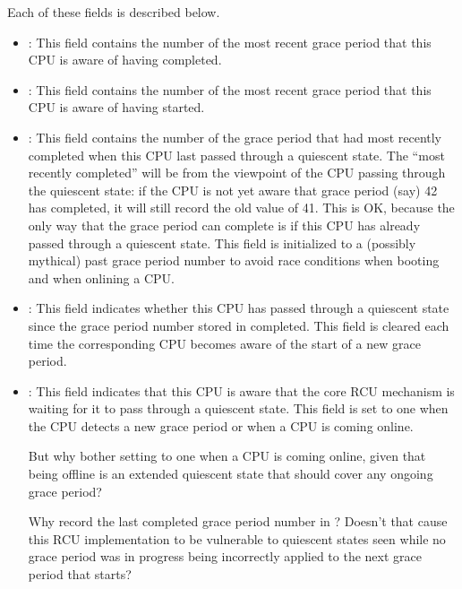 Each of these fields is described below.

\begin{itemize}
\item	{}:
	This field contains the number of the most recent grace period
	that this CPU is aware of having completed.
\item	{}:
	This field contains the number of the most recent grace period
	that this CPU is aware of having started.
\item	{}:
	This field contains the number of the grace period that had most
	recently completed when this
	CPU last passed through a quiescent state.
	The ``most recently completed'' will be from the viewpoint of
	the CPU passing through the quiescent state: if the CPU is
	not yet aware that grace period (say) 42 has completed, it
	will still record the old value of 41.
	This is OK, because the only way that the grace period can
	complete is if this CPU has already passed through a
	quiescent state.
	This field is initialized to a (possibly mythical) past
	grace period number to avoid race conditions when booting
	and when onlining a CPU.
\item	{}:
	This field indicates whether this CPU has passed
	through a quiescent state since the grace period number
	stored in  completed.
	This field is cleared each time the corresponding CPU
	becomes aware of the start of a new grace period.
\item	{}:
	This field indicates that this CPU is aware that the core
	RCU mechanism is waiting for it to pass through a quiescent state.
	This field is set to one when the CPU detects a new grace
	period or when a CPU is coming online.

\QuickQuiz{}
	But why bother setting  to one when a CPU
	is coming online, given that being offline is an extended
	quiescent state that should cover any ongoing grace period?
 \QuickQuizEnd

\QuickQuiz{}
	Why record the last completed grace period number in
	?
	Doesn't that cause this RCU implementation to be vulnerable
	to quiescent states seen while no grace period was in progress
	being incorrectly applied to the next grace period that starts?
\end{itemize}
